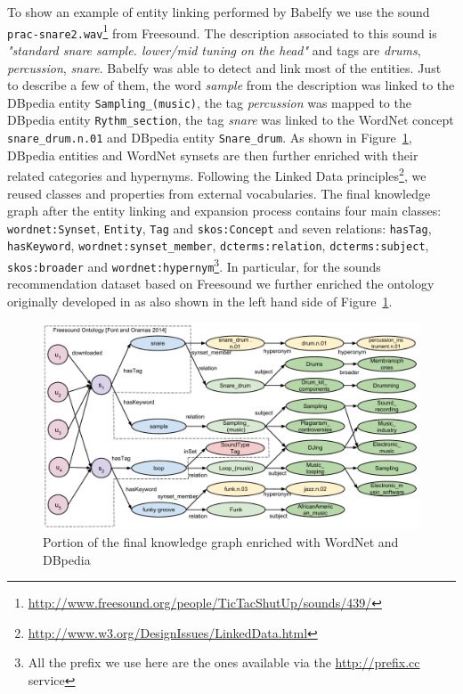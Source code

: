 To show an example of entity linking performed by Babelfy we use the sound \texttt{prac-snare2.wav}\footnote{\url{http://www.freesound.org/people/TicTacShutUp/sounds/439/}} from Freesound. The description associated to this sound is \textit{"standard snare sample. lower/mid tuning on the head"} and tags are \textit{drums}, \textit{percussion}, \textit{snare}. Babelfy was able to detect and link most of the entities. Just to describe a few of them, the word \textit{sample} from the description was linked to the DBpedia entity \texttt{Sampling\_(music)}, the tag \textit{percussion} was mapped to the DBpedia entity \texttt{Rythm\_section}, the tag \textit{snare} was linked to the WordNet concept \texttt{snare\_drum.n.01} and DBpedia entity \texttt{Snare\_drum}. As shown in Figure~\ref{fig:graph-rec:graph_enhancement}, DBpedia entities and WordNet synsets are then further enriched with their related categories and hypernyms. Following the Linked Data principles\footnote{\url{http://www.w3.org/DesignIssues/LinkedData.html}}, we reused classes and properties from external vocabularies. The final knowledge graph after the entity linking and expansion process contains four main classes: \texttt{wordnet:Synset}, \texttt{Entity}, \texttt{Tag} and \texttt{skos:Concept} and seven relations: \texttt{hasTag}, \texttt{hasKeyword}, \texttt{wordnet:synset\_member}, \texttt{dcterms:relation}, \texttt{dcterms:subject}, \texttt{skos:broader} and \texttt{wordnet:hypernym}\footnote{All the prefix we use here are the ones available via the \url{http://prefix.cc} service}.
In particular, for the sounds recommendation dataset based on Freesound we further enriched the ontology originally developed in \cite{Font2014} as also shown in the left hand side of Figure~\ref{fig:graph-rec:graph_enhancement}. 

\begin{figure}
\centering
\includegraphics[width=\textwidth]{ch07_graph-rec_pics/graph_all_final.pdf}
\caption{Portion of the final knowledge graph enriched with WordNet and DBpedia \label{fig:graph-rec:graph_enhancement}}
\end{figure}


